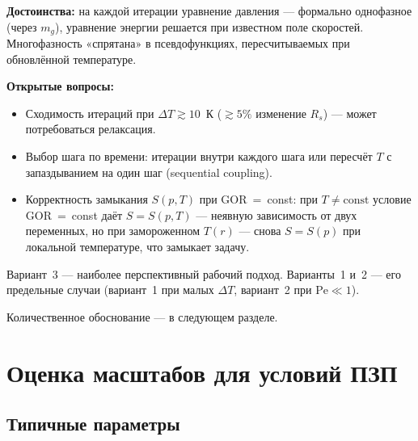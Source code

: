 ﻿\documentclass[12pt,a4paper]{article}
\begin{document}
\begin{enumerate}[nosep]
        \textbf{Достоинства:}
        на каждой итерации уравнение давления --- формально
        однофазное (через $m_g$), уравнение энергии решается
        при известном поле скоростей. Многофазность «спрятана»
        в псевдофункциях, пересчитываемых при обновлённой
        температуре.

        \textbf{Открытые вопросы:}
        \begin{itemize}[nosep]
          \item Сходимость итераций при $\Delta T \gtrsim 10$~К
                ($\gtrsim 5\%$ изменение $R_s$) ---
                может потребоваться релаксация.
          \item Выбор шага по времени: итерации внутри
                каждого шага или пересчёт $T$ с запаздыванием
                на один шаг (sequential coupling).
          \item Корректность замыкания $S(p,T)$ при GOR~=~const:
                при $T \neq \mathrm{const}$ условие
                GOR~=~const даёт $S = S(p,T)$ --- неявную
                зависимость от двух переменных, но при
                замороженном $T(r)$ --- снова $S = S(p)$
                при локальной температуре, что замыкает задачу.
        \end{itemize}
\end{enumerate}

Вариант~3 --- наиболее перспективный рабочий подход.
Варианты~1 и~2 --- его предельные случаи
(вариант~1 при малых $\Delta T$, вариант~2 при $\mathrm{Pe} \ll 1$).

Количественное обоснование --- в следующем разделе.


\section{Оценка масштабов для условий ПЗП}\label{sec:scales}

\subsection{Типичные параметры}\label{ssec:params}
\end{document}
